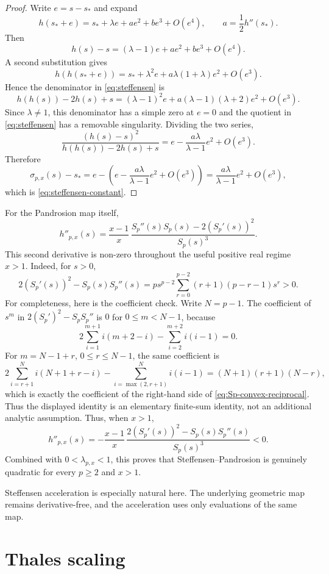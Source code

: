 \documentclass[10pt,a4paper]{article}
\theoremstyle{plain}
\theoremstyle{definition}
\theoremstyle{remark}
\newcommand{\stef}{\sigma_{p,x}}
\begin{document}
\begin{proof}
Write $e=s-s_*$ and expand
\[
  h(s_*+e)=s_*+\lambda e+a e^2+b e^3+O(e^4),
  \qquad a=\frac12h''(s_*).
\]
Then
\[
  h(s)-s=(\lambda-1)e+a e^2+b e^3+O(e^4).
\]
A second substitution gives
\[
  h(h(s_*+e))
  =s_*+\lambda^2 e+a\lambda(1+\lambda)e^2+O(e^3).
\]
Hence the denominator in \eqref{eq:steffensen} is
\[
  h(h(s))-2h(s)+s
  =(\lambda-1)^2e+a(\lambda-1)(\lambda+2)e^2+O(e^3).
\]
Since $\lambda\ne1$, this denominator has a simple zero at $e=0$ and the quotient
in \eqref{eq:steffensen} has a removable singularity.  Dividing the two series,
\[
  \frac{(h(s)-s)^2}{h(h(s))-2h(s)+s}
  =e-\frac{a\lambda}{\lambda-1}e^2+O(e^3).
\]
Therefore
\[
  \stef(s)-s_*
  =e-\left(e-\frac{a\lambda}{\lambda-1}e^2+O(e^3)\right)
  =\frac{a\lambda}{\lambda-1}e^2+O(e^3),
\]
which is \eqref{eq:steffensen-constant}.
\end{proof}

For the Pandrosion map itself,
\[
  h''_{p,x}(s)
  =\frac{x-1}{x}\,
    \frac{S_p''(s)S_p(s)-2(S_p'(s))^2}{S_p(s)^3}.
\]
This second derivative is non-zero throughout the useful positive real regime
$x>1$.  Indeed, for $s>0$,
\begin{equation}
  2(S_p'(s))^2-S_p(s)S_p''(s)
  =p s^{p-2}\sum_{r=0}^{p-2}(r+1)(p-r-1)s^r>0.
  \label{eq:Sp-convex-reciprocal}
\end{equation}
For completeness, here is the coefficient check.  Write $N=p-1$.  The
coefficient of $s^m$ in $2(S_p')^2-S_pS_p''$ is $0$ for $0\le m<N-1$, because
\[
2\sum_{i=1}^{m+1} i(m+2-i)-\sum_{i=2}^{m+2}i(i-1)=0.
\]
For $m=N-1+r$, $0\le r\le N-1$, the same coefficient is
\[
  2\sum_{i=r+1}^{N}i(N+1+r-i)-\sum_{i=\max(2,r+1)}^{N}i(i-1)
  =(N+1)(r+1)(N-r),
\]
which is exactly the coefficient of the right-hand side of
\eqref{eq:Sp-convex-reciprocal}.  Thus the displayed identity is an elementary
finite-sum identity, not an additional analytic assumption.
Thus, when $x>1$,
\[
  h''_{p,x}(s)
  =-\frac{x-1}{x}\,
    \frac{2(S_p'(s))^2-S_p(s)S_p''(s)}{S_p(s)^3}<0.
\]
Combined with $0<\lambda_{p,x}<1$, this proves that Steffensen--Pandrosion is
genuinely quadratic for every $p\ge2$ and $x>1$.

Steffensen acceleration is especially natural here.  The underlying geometric
map remains derivative-free, and the acceleration uses only evaluations of the
same map.

\section{Thales scaling}
\label{sec:scaling}
\end{document}
